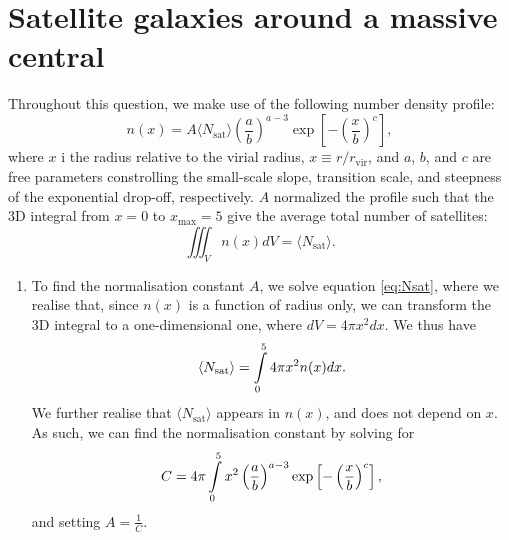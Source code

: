 \section{Satellite galaxies around a massive central}
Throughout this question, we make use of the following number density profile:
\begin{equation}
	n(x) = A\langle N_\text{sat}\rangle \left(\frac{a}{b}\right)^{a-3} \exp\left[-\left(\frac{x}{b}\right)^c\right],
\end{equation}
where $x$ i the radius relative to the virial radius, $x\equiv r/r_\text{vir}$, and $a$, $b$, and $c$ are free parameters constrolling the small-scale slope, transition scale, and steepness of the exponential drop-off, respectively. $A$ normalized the profile such that the 3D integral from $x=0$ to $x_\text{max}=5$ give the average total number of satellites:
\begin{equation}
	\iiint_V n(x)dV = \langle N_\text{sat}\rangle.
	\label{eq:Nsat}
\end{equation}

\begin{enumerate}[label=(\alph*)]
\item {
	To find the normalisation constant $A$, we solve equation \eqref{eq:Nsat}, where we realise that, since $n(x)$ is a function of radius only, we can transform the 3D integral to a one-dimensional one, where $dV = 4\pi x^2 dx$. We thus have
\begin{equation}
	\langle N_\text{sat}\rangle = \int\limits_{0}^{5} 4\pi x^2 n(x) dx.
\end{equation}
We further realise that $\langle N_\text{sat} \rangle$ appears in $n(x)$, and does not depend on $x$. As such, we can find the normalisation constant by solving for
\begin{equation}
	C = 4\pi\int\limits_{0}^{5} x^2 \left(\frac{a}{b}\right)^{a-3} \exp\left[-\left(\frac{x}{b}\right)^c\right],
\end{equation}
and setting $A = \frac{1}{C}$.
}
\end{enumerate}
